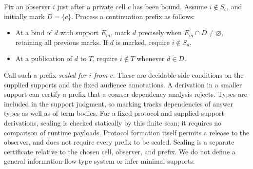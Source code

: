 Fix an observer $i$ just after a private cell $c$ has been bound.
Assume $i\notin S_c$, and initially mark $D=\{c\}$.
Process a continuation prefix as follows:
\begin{itemize}
\item At a bind of $d$ with support $E_m$, mark $d$ precisely when
      $E_m\cap D\ne\varnothing$, retaining all previous marks.
      If $d$ is marked, require $i\notin S_d$.
\item At a publication of $d$ to $T$, require $i\notin T$ whenever $d\in D$.
\end{itemize}
Call such a prefix \emph{sealed for $i$ from $c$}. These are decidable
side conditions on the supplied supports and the fixed audience annotations.
A derivation in a smaller support can certify a prefix that a coarser
dependency analysis rejects. Types are included in the support judgment,
so marking tracks dependencies of answer types as well as of term bodies.
For a fixed protocol and supplied support derivations, sealing is checked
statically by this finite scan; it requires no comparison of runtime
payloads. Protocol formation itself permits a release to the observer,
and does not require every prefix to be sealed. Sealing is a separate
certificate relative to the chosen cell, observer, and prefix. We do not
define a general information-flow type system or infer minimal supports.

